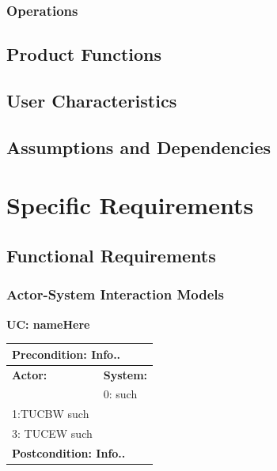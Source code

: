 \documentclass[12pt]{article}
\begin{document}
{            
            \subsubsection{Operations}
            	
           
		\subsection{Product Functions} 
		
		
	
    	\subsection{User Characteristics}  

   
   
    	\subsection{Assumptions and Dependencies}
    	
\pagebreak

	\section{Specific Requirements}
   
   
    	\subsection{Functional Requirements}
    	
    	
        \subsubsection{Actor-System Interaction Models}	
			{
				\noindent\textbf{UC: nameHere}
				\begin{flushleft}
					\begin{tabular}{ |p{7cm}|p{7cm}| } 
   						\hline
  						\multicolumn{2}{|p{\textwidth}|}{\textbf{Precondition:} Info..} \\
 						\hline
						\textbf {Actor: } & \textbf{System: }\\ 
						\hline
						 & 0: such\\ 
						\hline
 						1:TUCBW such &\\ 
						\hline
						3: TUCEW such & \\
  						\hline
  						\multicolumn{2}{|p{\textwidth}|}{\textbf{Postcondition: Info..}} \\
  						 \hline


\end{tabular}
\end{flushleft}}}
\end{document}
